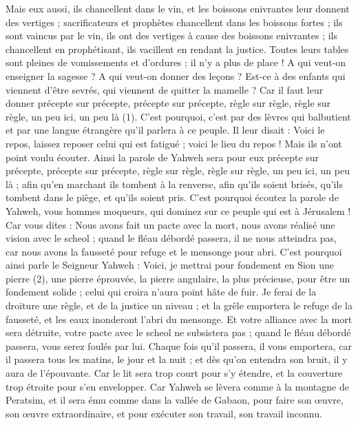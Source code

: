 \begin{multicols}{2}
Mais eux aussi, ils chancellent dans le vin, et les boissons enivrantes leur donnent des vertiges ; sacrificateurs et prophètes chancellent dans les boissons fortes ; ils sont vaincus par le vin, ils ont des vertiges à cause des boissons enivrantes ; ils chancellent en prophétisant, ils vacillent en rendant la justice.
Toutes leurs tables sont pleines de vomissements et d’ordures ; il n'y a plus de place !
A qui veut-on enseigner la sagesse ? A qui veut-on donner des leçons ? Est-ce à des enfants qui viennent d’être sevrés, qui viennent de quitter la mamelle ?
Car il faut leur donner précepte sur précepte, précepte sur précepte, règle sur règle, règle sur règle, un peu ici, un peu là (1).
C'est pourquoi, c’est par des lèvres qui balbutient et par une langue étrangère qu’il parlera à ce peuple.
Il leur disait : Voici le repos, laissez reposer celui qui est fatigué ; voici le lieu du repos ! Mais ils n'ont point voulu écouter.
Ainsi la parole de Yahweh sera pour eux précepte sur précepte, précepte sur précepte, règle sur règle, règle sur règle, un peu ici, un peu là ; afin qu’en marchant ils tombent à la renverse, afin qu'ils soient brisés, qu'ils tombent dans le piège, et qu'ils soient pris.
C'est pourquoi écoutez la parole de Yahweh, vous hommes moqueurs, qui dominez sur ce peuple qui est à Jérusalem !
Car vous dites : Nous avons fait un pacte avec la mort, nous avons réalisé une vision avec le scheol ; quand le fléau débordé passera, il ne nous atteindra pas, car nous avons la fausseté pour refuge et le mensonge pour abri.
C'est pourquoi ainsi parle le Seigneur Yahweh : Voici, je mettrai pour fondement en Sion une pierre (2), une pierre éprouvée, la pierre angulaire, la plus précieuse, pour être un fondement solide ; celui qui croira n’aura point hâte de fuir.
Je ferai de la droiture une règle, et de la justice un niveau ; et la grêle emportera le refuge de la fausseté, et les eaux inonderont l’abri du mensonge.
Et votre alliance avec la mort sera détruite, votre pacte avec le scheol ne subsistera pas ; quand le fléau débordé passera, vous serez foulés par lui.
Chaque fois qu'il passera, il vous emportera, car il passera tous les matins, le jour et la nuit ; et dès qu'on entendra son bruit, il y aura de l’épouvante.
Car le lit sera trop court pour s'y étendre, et la couverture trop étroite pour s’en envelopper.
Car Yahweh se lèvera comme à la montagne de Peratsim, et il sera ému comme dans la vallée de Gabaon, pour faire son œuvre, son œuvre extraordinaire, et pour exécuter son travail, son travail inconnu.

\end{multicols}
